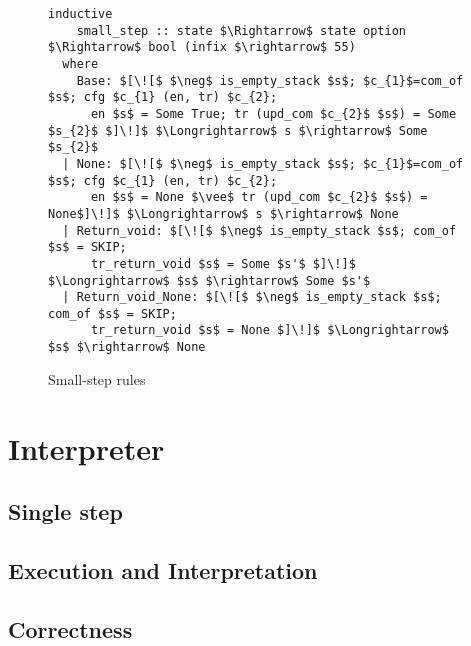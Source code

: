 \begin{figure}
  \begin{lstlisting}[frame=single, mathescape=true]
  inductive
    small_step :: state $\Rightarrow$ state option $\Rightarrow$ bool (infix $\rightarrow$ 55)
  where
    Base: $[\![$ $\neg$ is_empty_stack $s$; $c_{1}$=com_of $s$; cfg $c_{1} (en, tr) $c_{2};
      en $s$ = Some True; tr (upd_com $c_{2}$ $s$) = Some $s_{2}$ $]\!]$ $\Longrightarrow$ s $\rightarrow$ Some $s_{2}$
  | None: $[\![$ $\neg$ is_empty_stack $s$; $c_{1}$=com_of $s$; cfg $c_{1} (en, tr) $c_{2};
      en $s$ = None $\vee$ tr (upd_com $c_{2}$ $s$) = None$]\!]$ $\Longrightarrow$ s $\rightarrow$ None
  | Return_void: $[\![$ $\neg$ is_empty_stack $s$; com_of $s$ = SKIP;
      tr_return_void $s$ = Some $s'$ $]\!]$ $\Longrightarrow$ $s$ $\rightarrow$ Some $s'$
  | Return_void_None: $[\![$ $\neg$ is_empty_stack $s$; com_of $s$ = SKIP;
      tr_return_void $s$ = None $]\!]$ $\Longrightarrow$ $s$ $\rightarrow$ None
  \end{lstlisting}

  \caption{Small-step rules}
  \label{fig:small_step_rules}
\end{figure}


\section{Interpreter}\label{section:interpreter}

\subsection{Single step}\label{subsection:single_step}
\subsection{Execution and Interpretation}\label{subsection:exec_interp}
\subsection{Correctness}\label{subsection:correctness}
